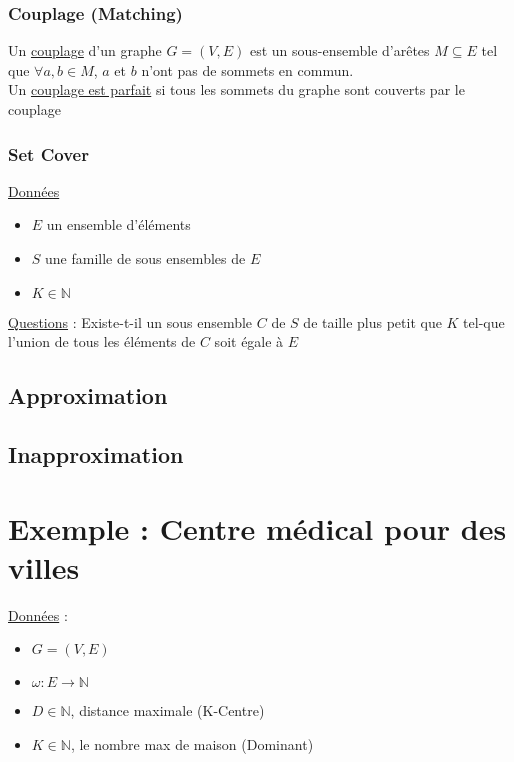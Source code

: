 \documentclass{article}
\theoremstyle{plain}
\begin{document}
      \subsubsection{Couplage (Matching)}

          Un \underline{couplage} d'un graphe $G = (V, E)$ est un sous-ensemble d'arêtes $M
          \subseteq E$ tel que $\forall a, b \in M$, $a$ et $b$ n'ont pas de
          sommets en commun.\\
          Un \underline{couplage est parfait} si tous les sommets du graphe
          sont couverts par le couplage

      \subsubsection{Set Cover}
 
        \underline{Données}
          \begin{itemize}
            \item $E$ un ensemble d'éléments
            \item $S$ une famille de sous ensembles de $E$
            \item $K \in \mathbb{N}$
          \end{itemize}

          \underline{Questions} : Existe-t-il un sous ensemble $C$ de $S$
                                  de taille plus petit que $K$ tel-que l'union
                                  de tous les éléments de $C$ soit égale à $E$

    \subsection{Approximation}

    \subsection{Inapproximation}

  \section{Exemple : Centre médical pour des villes}

    \underline{Données} :

      \begin{itemize}
        \item $G = (V, E)$
        \item $\omega : E \to \mathbb{N}$
        \item $D \in \mathbb{N}$, distance maximale (K-Centre)
        \item $K \in \mathbb{N}$, le nombre max de maison (Dominant)
      \end{itemize}
\end{document}

